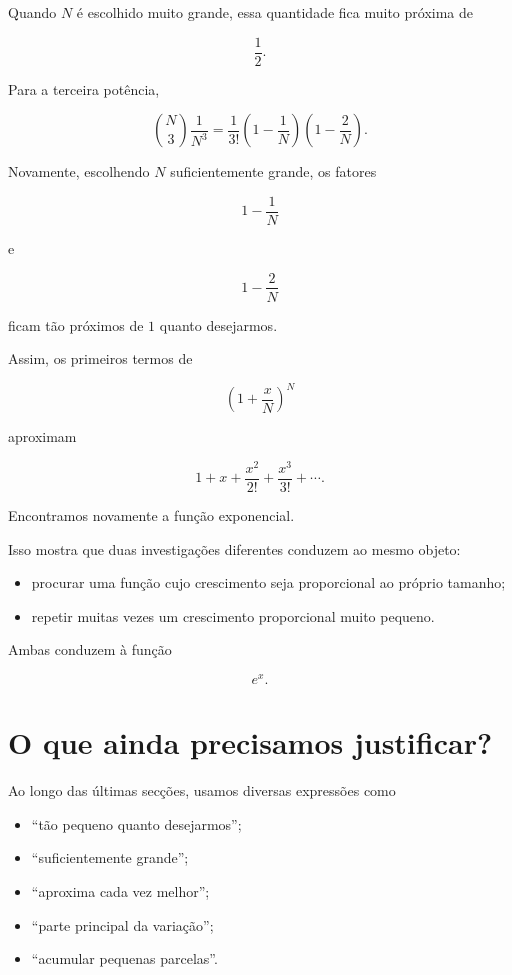 \documentclass[12pt,a4paper]{article}
\begin{document}
Quando \(N\) é escolhido muito grande, essa quantidade fica muito
próxima de

\[
\frac12.
\]

Para a terceira potência,

\[
\binom{N}{3}\frac1{N^3}
=
\frac{1}{3!}
\left(
1-\frac1N
\right)
\left(
1-\frac2N
\right).
\]

Novamente, escolhendo \(N\) suficientemente grande, os fatores

\[
1-\frac1N
\]

e

\[
1-\frac2N
\]

ficam tão próximos de \(1\) quanto desejarmos.

Assim, os primeiros termos de

\[
\left(1+\frac{x}{N}\right)^N
\]

aproximam

\[
1+x+\frac{x^2}{2!}+\frac{x^3}{3!}+\cdots.
\]

Encontramos novamente a função exponencial.

Isso mostra que duas investigações diferentes conduzem ao mesmo objeto:

\begin{itemize}
    \item procurar uma função cujo crescimento seja proporcional ao
    próprio tamanho;
    \item repetir muitas vezes um crescimento proporcional muito
    pequeno.
\end{itemize}

Ambas conduzem à função

\[
e^x.
\]

\section{O que ainda precisamos justificar?}

Ao longo das últimas secções, usamos diversas expressões como

\begin{itemize}
    \item ``tão pequeno quanto desejarmos'';
    \item ``suficientemente grande'';
    \item ``aproxima cada vez melhor'';
    \item ``parte principal da variação'';
    \item ``acumular pequenas parcelas''.
\end{itemize}
\end{document}
